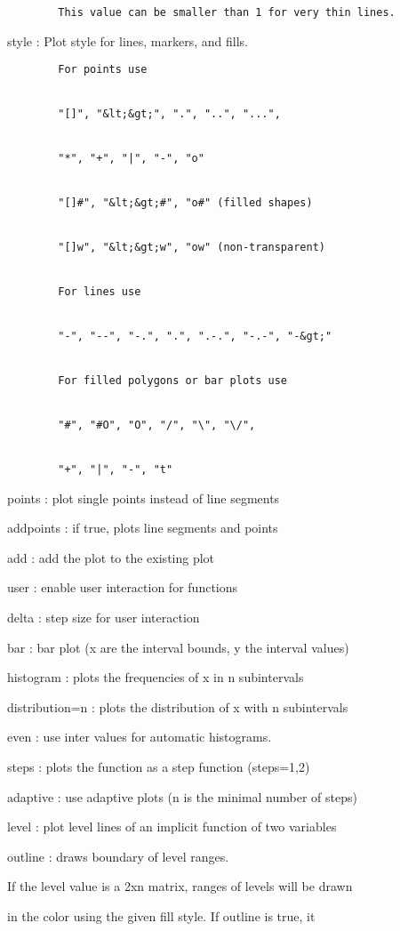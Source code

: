 \documentclass[
]{book}
\begin{document}
\begin{verbatim}
        This value can be smaller than 1 for very thin lines.
\end{verbatim}

style : Plot style for lines, markers, and fills.

\begin{verbatim}
        For points use


        "[]", "&lt;&gt;", ".", "..", "...",


        "*", "+", "|", "-", "o"


        "[]#", "&lt;&gt;#", "o#" (filled shapes)


        "[]w", "&lt;&gt;w", "ow" (non-transparent)


        For lines use


        "-", "--", "-.", ".", ".-.", "-.-", "-&gt;"


        For filled polygons or bar plots use


        "#", "#O", "O", "/", "\", "\/",


        "+", "|", "-", "t"
\end{verbatim}

points : plot single points instead of line segments

addpoints : if true, plots line segments and points

add : add the plot to the existing plot

user : enable user interaction for functions

delta : step size for user interaction

bar : bar plot (x are the interval bounds, y the interval values)

histogram : plots the frequencies of x in n subintervals

distribution=n : plots the distribution of x with n subintervals

even : use inter values for automatic histograms.

steps : plots the function as a step function (steps=1,2)

adaptive : use adaptive plots (n is the minimal number of steps)

level : plot level lines of an implicit function of two variables

outline : draws boundary of level ranges.

If the level value is a 2xn matrix, ranges of levels will be drawn

in the color using the given fill style. If outline is true, it
\end{document}
